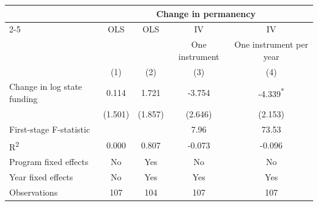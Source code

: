\begin{table}[htbp]
\centering
\label{tab:iv_permanence_12m}
\begin{tabular}{l*{4}{c}}
\toprule
 & \multicolumn{4}{c}{Change in permanency} \\
\cmidrule(lr){2-5}
 & OLS & OLS & IV & IV \\
 &  &  & One instrument & One instrument per year \\
 & (1) & (2) & (3) & (4) \\
\midrule
Change in log state funding & 0.114 & 1.721 & -3.754 & -4.339\textsuperscript{*} \\
 & (1.501) & (1.857) & (2.646) & (2.153) \\
First-stage F-statistic &  &  & 7.96 & 73.53 \\
R\textsuperscript{2} & 0.000 & 0.807 & -0.073 & -0.096 \\
Program fixed effects & No & Yes & No & No \\
Year fixed effects & No & Yes & Yes & Yes \\
Observations & 107 & 104 & 107 & 107 \\
\bottomrule
\end{tabular}
\end{table}
